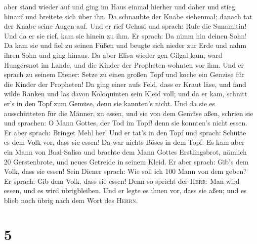 aber stand wieder auf und ging im Haus einmal hierher und daher und
stieg hinauf und breitete sich über ihn. Da schnaubte der Knabe
siebenmal; danach tat der Knabe seine Augen auf.  Und er
rief Gehasi und sprach: Rufe die Sunamitin! Und da er sie rief, kam sie
hinein zu ihm. Er sprach: Da nimm hin deinen Sohn!  Da
kam sie und fiel zu seinen Füßen und beugte sich nieder zur Erde und
nahm ihren Sohn und ging hinaus.  Da aber Elisa wieder
gen Gilgal kam, ward Hungersnot im Lande, und die Kinder der Propheten
wohnten vor ihm. Und er sprach zu seinem Diener: Setze zu einen großen
Topf und koche ein Gemüse für die Kinder der Propheten! 
Da ging einer aufs Feld, dass er Kraut läse, und fand wilde Ranken und
las davon Koloquinten sein Kleid voll; und da er kam, schnitt er's in
den Topf zum Gemüse, denn sie kannten's nicht.  Und da
sie es ausschütteten für die Männer, zu essen, und sie von dem Gemüse
aßen, schrien sie und sprachen: O Mann Gottes, der Tod im Topf! denn sie
konnten's nicht essen.  Er aber sprach: Bringet Mehl her!
Und er tat's in den Topf und sprach: Schütte es dem Volk vor, dass sie
essen! Da war nichts Böses in dem Topf.  Es kam aber ein
Mann von Baal-Salisa und brachte dem Mann Gottes Erstlingsbrot, nämlich
20 Gerstenbrote, und neues Getreide in seinem Kleid. Er aber sprach:
Gib's dem Volk, dass sie essen!  Sein Diener sprach: Wie
soll ich 100 Mann von dem geben? Er sprach: Gib dem Volk, dass sie
essen! Denn so spricht der \textsc{Herr}: Man wird essen, und es wird
übrigbleiben.  Und er legte es ihnen vor, dass sie aßen;
und es blieb noch übrig nach dem Wort des \textsc{Herrn}.

\hypertarget{section-4}{%
\section{5}\label{section-4}}

